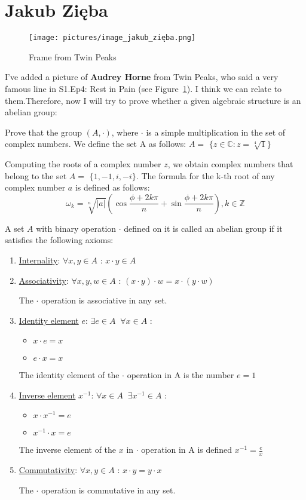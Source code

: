 \section{Jakub Zięba}
 
\begin{figure}[htbp]
    \centering
    \texttt{[image: pictures/image\_jakub\_zięba.png]}  
    \caption{Frame from Twin Peaks}
    \label{fig:twin_peaks}
\end{figure}

I've added a picture of \textbf{Audrey Horne} from Twin Peaks, who said a very famous line in \text S1.Ep4: Rest in Pain (see Figure~\ref{fig:twin_peaks}). I think we can relate to them.Therefore, now I will try to prove whether a given algebraic structure is an abelian group:

Prove that the group $(A,\cdot)$, where $\cdot$ is a simple multiplication in the set of complex numbers. We define the set A as follows: $A =$ $\{{z \in \mathbb{C}:z=\sqrt[4]{1}\}}$ 

Computing the roots of a complex number $z$, we obtain complex numbers that belong to the set $A =$ $\{{1,-1,i,-i\}}$. The formula for the k-th root of any complex number $a$ is defined as follows:
\[{\omega_k}=\sqrt[n]{|a|}(\cos\frac{\phi+2k\pi}{n}+\sin\frac{\phi+2k\pi}{n}), k\in\mathbb{Z}\]

A set $A$ with binary operation $\cdot$ defined on it is called an abelian group if it satisfies the following axioms:

\begin{enumerate}
\item \underline{Internality}: $\forall x,y \in A $ : $x \cdot y \in A$


\item \underline{Associativity}: $\forall x,y,w \in A $ : $(x \cdot y)\cdot w = x\cdot (y\cdot w)$

The $\cdot$ operation is associative in any set.
\item \underline{Identity element} $e$: $\exists e\in A \;\; \forall x \in A $ :
\begin{itemize}
\item $x \cdot e = x $
\item $e \cdot x = x $
\end{itemize}
The identity element of the $\cdot$ operation in A is the number $e=1$

\item \underline{Inverse element} $x^{-1}$: $\forall x\in A \;\; \exists x^{-1} \in A $ :
\begin{itemize}
\item $x \cdot x^{-1} = e $
\item $x^{-1} \cdot x = e $
\end{itemize}
The inverse element of the $x$ in $\cdot$ operation in A is defined $x^{-1}=\frac{e}{x}$

\item \underline{Commutativity}: $\forall x,y \in A $ : $x \cdot y = y \cdot x$

The $\cdot$ operation is commutative in any set.
\end{enumerate}

\newpage